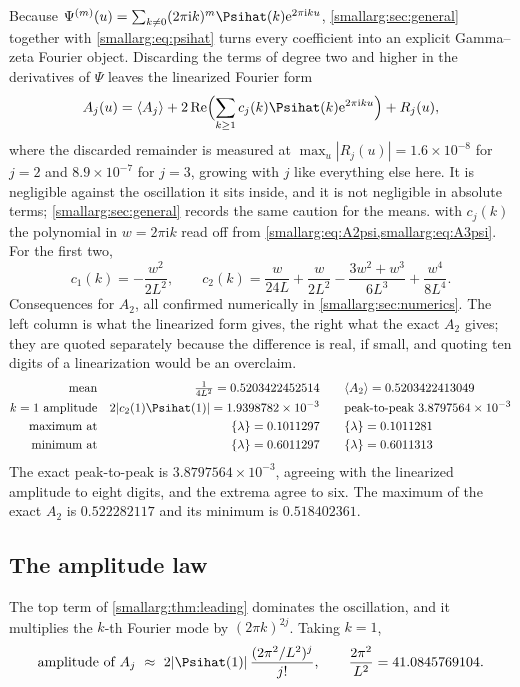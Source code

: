 \documentclass[11pt,oneside]{article}
\theoremstyle{definition}
\theoremstyle{remark}
\newcommand{\e}{\mathrm e}
\newcommand{\ii}{\mathrm i}
\begin{document}
Because $\Psi^{(m)}(u)=\sum_{k\ne0}(2\pi\ii k)^m\Psihat(k)\e^{2\pi\ii ku}$,
\cref{smallarg:sec:general} together with \cref{smallarg:eq:psihat} turns every coefficient into
an explicit Gamma--zeta Fourier object.  Discarding the terms of degree two
and higher in the derivatives of $\Psi$ leaves the linearized Fourier form
\[
  A_j(u)=\langle A_j\rangle
   +2\operatorname{Re}\Bigl(\sum_{k\ge1}c_j(k)\Psihat(k)\e^{2\pi\ii ku}\Bigr)
   +R_j(u),
\]
where the discarded remainder is measured at
$\max_u|R_j(u)|=1.6\times10^{-8}$ for $j=2$ and $8.9\times10^{-7}$ for
$j=3$, growing with $j$ like everything else here.  It is negligible against
the oscillation it sits inside, and it is not negligible in absolute terms;
\cref{smallarg:sec:general} records the same caution for the means.
with $c_j(k)$ the polynomial in $w=2\pi\ii k$ read off from
\cref{smallarg:eq:A2psi,smallarg:eq:A3psi}.  For the first two,
\[
  c_1(k)=-\frac{w^2}{2L^2},
  \qquad
  c_2(k)=\frac{w}{24L}+\frac{w}{2L^2}-\frac{3w^2+w^3}{6L^3}+\frac{w^4}{8L^4}.
\]
Consequences for $A_2$, all confirmed numerically in \cref{smallarg:sec:numerics}.
The left column is what the linearized form gives, the right what the exact
$A_2$ gives; they are quoted separately because the difference is real, if
small, and quoting ten digits of a linearization would be an overclaim.
\[
\begin{aligned}
  \text{mean}&&\tfrac1{4L^2}=0.5203422452514&\qquad
    \langle A_2\rangle=0.5203422413049\\
  k=1\ \text{amplitude}&&2|c_2(1)\Psihat(1)|=1.9398782\times10^{-3}&\qquad
    \text{peak-to-peak }3.8797564\times10^{-3}\\
  \text{maximum at}&&\{\lambda\}=0.1011297&\qquad\{\lambda\}=0.1011281\\
  \text{minimum at}&&\{\lambda\}=0.6011297&\qquad\{\lambda\}=0.6011313
\end{aligned}
\]
The exact peak-to-peak is $3.8797564\times10^{-3}$, agreeing with the
linearized amplitude to eight digits, and the extrema agree to six.  The
maximum of the exact $A_2$ is $0.522282117$ and its minimum is
$0.518402361$.

\subsection{The amplitude law}

The top term of \cref{smallarg:thm:leading} dominates the oscillation, and it multiplies
the $k$-th Fourier mode by $(2\pi k)^{2j}$.  Taking $k=1$,
\begin{equation}\label{smallarg:eq:amplitude}
  \text{amplitude of }A_j\ \approx\
  2|\Psihat(1)|\,\frac{(2\pi^2/L^2)^j}{j!},
  \qquad \frac{2\pi^2}{L^2}=41.0845769104 .
\end{equation}
\end{document}
